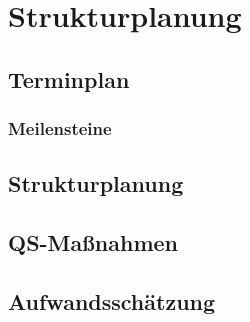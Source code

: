 
\chapter{Strukturplanung}

	\section{Terminplan}
	
		\subsection{Meilensteine}
	
	\section{Strukturplanung}
	
	\section{QS-Maßnahmen}
	
	\section{Aufwandsschätzung}